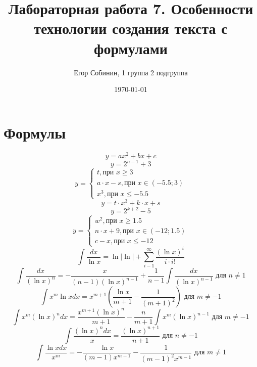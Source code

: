 \documentclass[a4paper,12pt]{article} %
\author{Егор Собинин, 1 группа 2 подгруппа}
\title{Лабораторная работа 7. Особенности технологии создания текста с формулами}
\date{\today}
\begin{document}
\maketitle
\newpage
\section{Формулы}
$$ y = ax^2+bx+c$$
$$ y = 2^{n-1}+3$$
$$y = 
 \begin{cases}
   t, \text{при } x\geq3\\
   a \cdot x-s, \text{при } x\in (-5.5 ; 3)\\
   x^3, \text{при } x\leq -5.5
 \end{cases}$$
$$y = t \cdot x^3 + k \cdot x + s$$
$$ y = 2^{k+2}-5$$
$$y = 
 \begin{cases}
   w^2, \text{при } x\geq 1.5\\
   n \cdot x + 9, \text{при } x\in (-12 ; 1.5)\\
   c-x, \text{при } x\leq -12
 \end{cases}$$
 $$\int \frac{dx}{\ln x} = \ln | \ln | + \sum_{i-1}^\infty \frac{(\ln x)^i}{i \cdot i!}$$
 $$\int \frac{dx}{(\ln x)^n} = -\frac{x}{(n-1)(\ln x)^{n-1}} + \frac{1}{n-1} \int \frac{dx}{(\ln x)^{n-1}} \text{ для } n \neq 1$$
 $$\int x^m \ln x dx = x ^ {m+1} (\frac{\ln x}{m+1} - \frac{1}{(m+1)^2}) \text{ для } m \neq -1$$
 $$\int x^m(\ln x)^n dx = \frac{x^{m+1}(\ln x)^n}{m+1} - \frac{n}{m+1} \int x^m(\ln x)^{n-1} \text{ для } m \neq -1$$
 $$\int \frac{(\ln x)^{n}dx}{x} = \frac{(\ln x)^{n+1}}{n+1} \text{ для } n \neq -1$$
 $$\int \frac{\ln x dx}{x^m} = - \frac{\ln x}{(m-1)x^{m-1}} - \frac{1}{(m-1)^2x^{m-1}} \text{ для } m \neq 1$$
\end{document}

